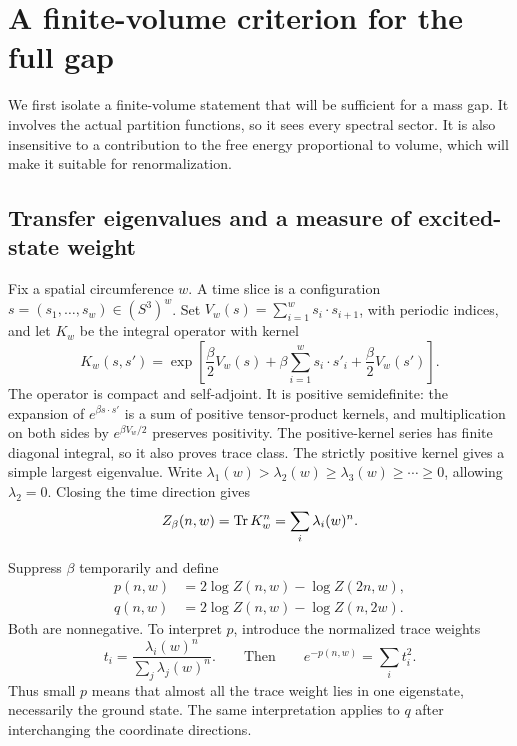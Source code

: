 \section{A finite-volume criterion for the full gap}
\label{sec:finite-volume}

We first isolate a finite-volume statement that will be sufficient for a
mass gap. It involves the actual partition functions, so it sees every
spectral sector. It is also insensitive to a contribution to the free
energy proportional to volume, which will make it suitable for
renormalization.

\subsection{Transfer eigenvalues and a measure of excited-state weight}

Fix a spatial circumference \(w\). A time slice is a configuration
\(s=(s_1,\ldots,s_w)\in(S^3)^w\). Set
\(V_w(s)=\sum_{i=1}^w s_i\cdot s_{i+1}\), with periodic indices, and let
\(K_w\) be the integral operator with kernel
\begin{equation}
\label{eq:transfer-kernel}
 K_w(s,s')=
 \exp\!\left[\frac\beta2 V_w(s)+\beta\sum_{i=1}^w s_i\cdot s'_i
                         +\frac\beta2V_w(s')\right].
\end{equation}
The operator is compact and self-adjoint. It is positive semidefinite:
the expansion of \(e^{\beta s\cdot s'}\) is a sum of positive
tensor-product kernels, and multiplication on both sides by
\(e^{\beta V_w/2}\) preserves positivity. The positive-kernel series has
finite diagonal integral, so it also proves trace class. The strictly
positive kernel gives a simple largest eigenvalue. Write
\(\lambda_1(w)>\lambda_2(w)\ge\lambda_3(w)\ge\cdots\ge0\), allowing
\(\lambda_2=0\). Closing the time direction gives
\begin{equation}
\label{eq:trace}
 Z_\beta(n,w)=\operatorname{Tr} K_w^n=\sum_i\lambda_i(w)^n.
\end{equation}

Suppress \(\beta\) temporarily and define
\begin{align}
 p(n,w)&=2\log Z(n,w)-\log Z(2n,w),\label{eq:p}\\
 q(n,w)&=2\log Z(n,w)-\log Z(n,2w).\label{eq:q}
\end{align}
Both are nonnegative. To interpret \(p\), introduce the normalized trace
weights
\begin{equation}
 t_i=\frac{\lambda_i(w)^n}{\sum_j\lambda_j(w)^n}.
 \qquad\text{Then}\qquad
 e^{-p(n,w)}=\sum_i t_i^2.
\label{eq:purity}
\end{equation}
Thus small \(p\) means that almost all the trace weight lies in one
eigenstate, necessarily the ground state. The same interpretation applies
to \(q\) after interchanging the coordinate directions.

